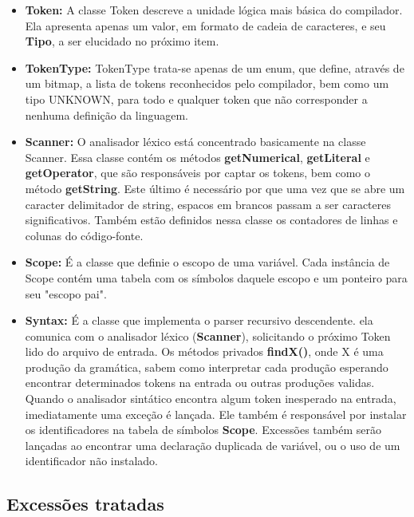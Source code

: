 \documentclass[11pt]{article}
\begin{document}
		
		\begin{itemize}
			
			\item \textbf{Token: }A classe Token descreve a unidade lógica mais básica do compilador. 
			Ela apresenta apenas um valor, em formato de cadeia de caracteres, e seu \textbf{Tipo}, 
			a ser elucidado no próximo item. 
			
			\item \textbf{TokenType: } TokenType trata-se apenas de um enum, que define, 
			através de um bitmap, a lista de tokens reconhecidos pelo compilador, bem como um tipo UNKNOWN, 
			para todo e qualquer token que não corresponder a nenhuma definição da linguagem.
			
			\item \textbf{Scanner: } O analisador léxico está concentrado basicamente na classe Scanner. 
			Essa classe contém os métodos \textbf{getNumerical}, \textbf{getLiteral} e \textbf{getOperator}, 
			que são responsáveis por captar os tokens, bem como o método \textbf{getString}. 
			Este último é necessário por que uma vez que se abre um caracter delimitador de string, 
			espacos em brancos passam a ser caracteres significativos. 
			Também estão definidos nessa classe os contadores de linhas e colunas do código-fonte.
			
			\item \textbf{Scope: } É a classe que definie o escopo de uma variável. 
			Cada instância de Scope contém uma tabela com os símbolos daquele escopo e um ponteiro para seu "escopo pai".
			
			\item \textbf{Syntax: } É a classe que implementa o parser recursivo descendente. 
			ela comunica com o analisador léxico (\textbf{Scanner}), solicitando o próximo Token lido do arquivo de entrada.
			Os métodos privados \textbf{findX()}, onde X é uma produção da gramática, sabem como interpretar cada produção
			esperando encontrar determinados tokens na entrada ou outras produções validas. Quando o analisador sintático 
			encontra algum token inesperado na entrada, imediatamente uma exceção é lançada. 
			Ele também é responsável por instalar os identificadores na tabela de símbolos \textbf{Scope}. 
			Excessões também serão lançadas  ao encontrar uma declaração duplicada de variável, ou o uso de um identificador
			não instalado.  
		
		\end{itemize}
		
	\subsection{Excessões tratadas}
	
\end{document}

